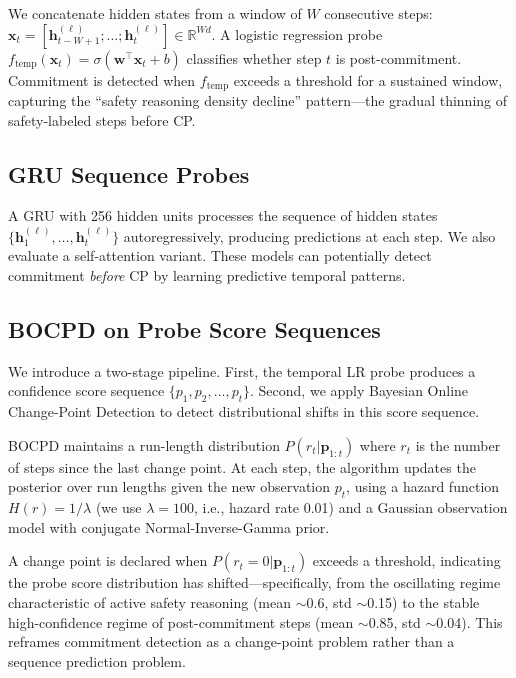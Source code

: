 \documentclass[11pt,a4paper]{article}
\begin{document}
We concatenate hidden states from a window of $W$ consecutive steps: $\mathbf{x}_t = [\mathbf{h}_{t-W+1}^{(\ell)}; \ldots; \mathbf{h}_t^{(\ell)}] \in \mathbb{R}^{Wd}$. A logistic regression probe $f_\text{temp}(\mathbf{x}_t) = \sigma(\mathbf{w}^\top \mathbf{x}_t + b)$ classifies whether step $t$ is post-commitment. Commitment is detected when $f_\text{temp}$ exceeds a threshold for a sustained window, capturing the ``safety reasoning density decline'' pattern---the gradual thinning of safety-labeled steps before CP.

\subsection{GRU Sequence Probes}
\label{sec:gru}

A GRU with 256 hidden units processes the sequence of hidden states $\{\mathbf{h}_1^{(\ell)}, \ldots, \mathbf{h}_t^{(\ell)}\}$ autoregressively, producing predictions at each step. We also evaluate a self-attention variant. These models can potentially detect commitment \emph{before} CP by learning predictive temporal patterns.

\subsection{BOCPD on Probe Score Sequences}
\label{sec:bocpd}

We introduce a two-stage pipeline. First, the temporal LR probe produces a confidence score sequence $\{p_1, p_2, \ldots, p_t\}$. Second, we apply Bayesian Online Change-Point Detection \cite{adams2007bayesian} to detect distributional shifts in this score sequence.

BOCPD maintains a run-length distribution $P(r_t | \mathbf{p}_{1:t})$ where $r_t$ is the number of steps since the last change point. At each step, the algorithm updates the posterior over run lengths given the new observation $p_t$, using a hazard function $H(r) = 1/\lambda$ (we use $\lambda = 100$, i.e., hazard rate 0.01) and a Gaussian observation model with conjugate Normal-Inverse-Gamma prior.

A change point is declared when $P(r_t = 0 | \mathbf{p}_{1:t})$ exceeds a threshold, indicating the probe score distribution has shifted---specifically, from the oscillating regime characteristic of active safety reasoning (mean $\sim$0.6, std $\sim$0.15) to the stable high-confidence regime of post-commitment steps (mean $\sim$0.85, std $\sim$0.04). This reframes commitment detection as a change-point problem rather than a sequence prediction problem.
\end{document}

